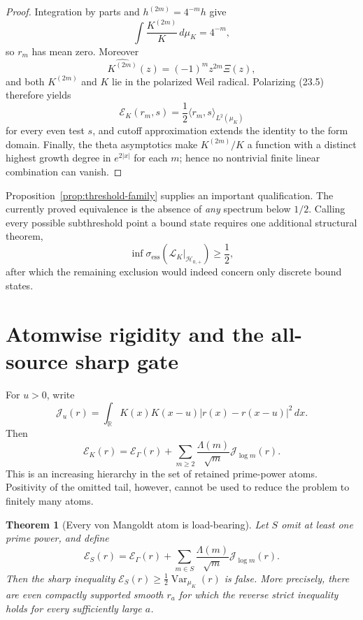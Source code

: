 \documentclass[11pt]{amsart}
\newtheorem{theorem}{Theorem}[section]
\theoremstyle{definition}
\theoremstyle{remark}
\begin{document}
\begin{proof}
Integration by parts and \(h^{(2m)}=4^{-m}h\) give
\[
 \int\frac{K^{(2m)}}K\,d\mu_K=4^{-m},
\]
so \(r_m\) has mean zero.  Moreover
\[
 \widehat{K^{(2m)}}(z)=(-1)^mz^{2m}\Xi(z),
\]
and both \(K^{(2m)}\) and \(K\) lie in the polarized Weil radical.
Polarizing (23.5) therefore yields
\[
 \mathscr E_K(r_m,s)
 =\frac12\langle r_m,s\rangle_{L^2(\mu_K)}
\tag{23.11}
\]
for every even test \(s\), and cutoff approximation extends the identity
to the form domain.  Finally, the theta asymptotics make
\(K^{(2m)}/K\) a function with a distinct highest growth degree in
\(e^{2|x|}\) for each \(m\); hence no nontrivial finite linear
combination can vanish.
\end{proof}

Proposition~\ref{prop:threshold-family} supplies an important qualification.
The currently proved equivalence is the absence of \emph{any} spectrum below
\(1/2\).  Calling every possible subthreshold point a bound state requires
one additional structural theorem,
\[
 \inf\sigma_{\mathrm{ess}}
 (\mathcal L_K|_{\mathcal H_{0,+}})\ge\frac12,
\tag{23.12}
\]
after which the remaining exclusion would indeed concern only discrete
bound states.

\section{Atomwise rigidity and the all-source sharp gate}
\label{sec:atomwise-rigidity}

For \(u>0\), write
\[
 \mathcal J_u(r)
 =\int_\mathbb R K(x)K(x-u)
 |r(x)-r(x-u)|^2\,dx.
\tag{24.1}
\]
Then
\[
 \mathscr E_K(r)
 =\mathscr E_\Gamma(r)
  +\sum_{m\ge2}\frac{\Lambda(m)}{\sqrt m}
       \mathcal J_{\log m}(r).
\tag{24.2}
\]
This is an increasing hierarchy in the set of retained prime-power atoms.
Positivity of the omitted tail, however, cannot be used to reduce the
problem to finitely many atoms.

\begin{theorem}[Every von Mangoldt atom is load-bearing]
\label{thm:atomwise-load}
Let \(S\) omit at least one prime power, and define
\[
 \mathscr E_S(r)
 =\mathscr E_\Gamma(r)
  +\sum_{m\in S}\frac{\Lambda(m)}{\sqrt m}
       \mathcal J_{\log m}(r).
\tag{24.3}
\]
Then the sharp inequality
\(\mathscr E_S(r)\ge\tfrac12\operatorname{Var}_{\mu_K}(r)\)
is false.  More precisely, there are even compactly supported smooth
\(r_a\) for which the reverse strict inequality holds for every
sufficiently large \(a\).
\end{theorem}
\end{document}
